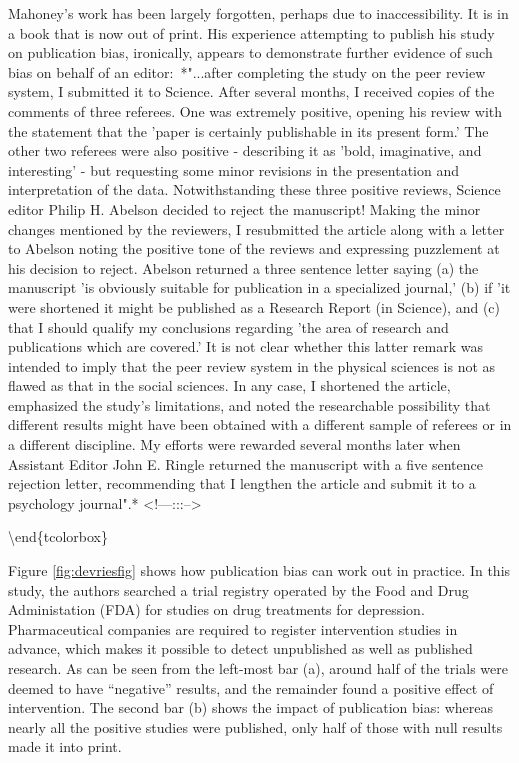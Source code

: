 \documentclass{krantz}
\begin{document}
\begin{tcolorbox}[colback=Black!5!lightgray,colframe=black!75!black,coltitle=white,title=Michael Mahoney: A man ahead of his time]\label{box:Mahoney}
Mahoney's work has been largely forgotten, perhaps due to inaccessibility. It is in a book that is now out of print. His experience attempting to publish his study on publication bias, ironically, appears to demonstrate further evidence of such bias on behalf of an editor:\
*"...after completing the study on the peer review system, I submitted it to Science. After several months, I received copies of the comments of three referees. One was extremely positive, opening his review with the statement that the 'paper is certainly publishable in its present form.' The other two referees were also positive - describing it as 'bold, imaginative, and interesting' - but requesting some minor revisions in the presentation and interpretation of the data. Notwithstanding these three positive reviews, Science editor Philip H. Abelson decided to reject the manuscript! Making the minor changes mentioned by the reviewers, I resubmitted the article along with a letter to Abelson noting the positive tone of the reviews and expressing puzzlement at his decision to reject. Abelson returned a three sentence letter saying (a) the manuscript 'is obviously suitable for publication in a specialized journal,' (b) if 'it were shortened it might be published as a Research Report (in Science), and (c) that I should qualify my conclusions regarding 'the area of research and publications which are covered.' It is not clear whether this latter remark was intended to imply that the peer review system in the physical sciences is not as flawed as that in the social sciences. In any case, I shortened the article, emphasized the study's limitations, and noted the researchable possibility that different results might have been obtained with a different sample of referees or in a different discipline. My efforts were rewarded several months later when Assistant Editor John E. Ringle returned the manuscript with a five sentence rejection letter, recommending that I lengthen the article and submit it to a psychology journal".*
<!---:::-->
\end{tcolorbox}

\textbackslash end\{tcolorbox\}

Figure \ref{fig:devriesfig} shows how publication bias can work out in practice. In this study, the authors searched a trial registry operated by the Food and Drug Administation (FDA) for studies on drug treatments for depression. Pharmaceutical companies are required to register intervention studies in advance, which makes it possible to detect unpublished as well as published research. As can be seen from the left-most bar (a), around half of the trials were deemed to have ``negative'' results, and the remainder found a positive effect of intervention. The second bar (b) shows the impact of publication bias: whereas nearly all the positive studies were published, only half of those with null results made it into print.
\end{document}
